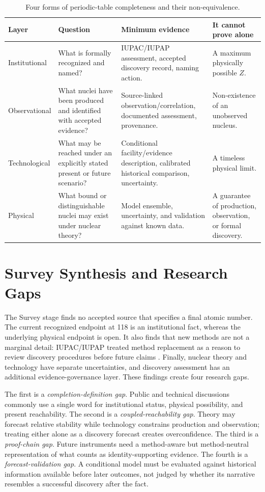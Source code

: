 \documentclass[conference]{IEEEtran}
\begin{document}
\begin{table}[!t]
\caption{Four forms of periodic-table completeness and their non-equivalence.}
\label{tab:four-layers}
\centering
\renewcommand{\arraystretch}{1.23}
\begin{tabular}{|P{0.17\textwidth}|P{0.25\textwidth}|P{0.28\textwidth}|P{0.16\textwidth}|}
\hline
\textbf{Layer} & \textbf{Question} & \textbf{Minimum evidence} & \textbf{It cannot prove alone} \\
\hline
Institutional & What is formally recognized and named? & IUPAC/IUPAP assessment, accepted discovery record, naming action. & A maximum physically possible \(Z\). \\
\hline
Observational & What nuclei have been produced and identified with accepted evidence? & Source-linked observation/correlation, documented assessment, provenance. & Non-existence of an unobserved nucleus. \\
\hline
Technological & What may be reached under an explicitly stated present or future scenario? & Conditional facility/evidence description, calibrated historical comparison, uncertainty. & A timeless physical limit. \\
\hline
Physical & What bound or distinguishable nuclei may exist under nuclear theory? & Model ensemble, uncertainty, and validation against known data. & A guarantee of production, observation, or formal discovery. \\
\hline
\end{tabular}
\end{table}

\section{Survey Synthesis and Research Gaps}

The Survey stage finds no accepted source that specifies a final atomic number. The current recognized endpoint at 118 is an institutional fact, whereas the underlying physical endpoint is open. It also finds that new methods are not a marginal detail: IUPAC/IUPAP treated method replacement as a reason to review discovery procedures before future claims \cite{iupac2018}. Finally, nuclear theory and technology have separate uncertainties, and discovery assessment has an additional evidence-governance layer. These findings create four research gaps.

The first is a \emph{completion-definition gap}. Public and technical discussions commonly use a single word for institutional status, physical possibility, and present reachability. The second is a \emph{coupled-reachability gap}. Theory may forecast relative stability while technology constrains production and observation; treating either alone as a discovery forecast creates overconfidence. The third is a \emph{proof-chain gap}. Future instruments need a method-aware but method-neutral representation of what counts as identity-supporting evidence. The fourth is a \emph{forecast-validation gap}. A conditional model must be evaluated against historical information available before later outcomes, not judged by whether its narrative resembles a successful discovery after the fact.
\end{document}
